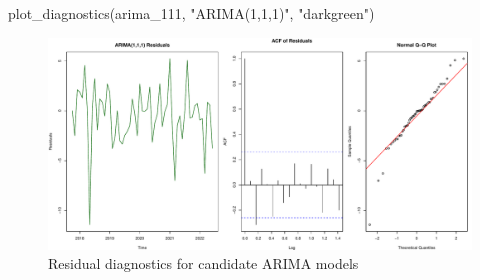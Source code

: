 \documentclass[
  11pt,
]{article}
\newenvironment{Shaded}{\begin{snugshade}}{\end{snugshade}}
\newcommand{\FunctionTok}[1]{\textcolor[rgb]{0.28,0.35,0.67}{#1}}
\newcommand{\NormalTok}[1]{\textcolor[rgb]{0.00,0.23,0.31}{#1}}
\newcommand{\StringTok}[1]{\textcolor[rgb]{0.13,0.47,0.30}{#1}}
\begin{document}
\begin{Shaded}
\begin{Highlighting}[]
\FunctionTok{plot\_diagnostics}\NormalTok{(arima\_111, }\StringTok{"ARIMA(1,1,1)"}\NormalTok{, }\StringTok{"darkgreen"}\NormalTok{)}
\end{Highlighting}
\end{Shaded}

\begin{figure}[H]

{\centering \includegraphics{project_files/figure-pdf/fig-arima-diagnostics-3.pdf}

}

\caption{Residual diagnostics for candidate ARIMA models}

\end{figure}%
\end{document}
